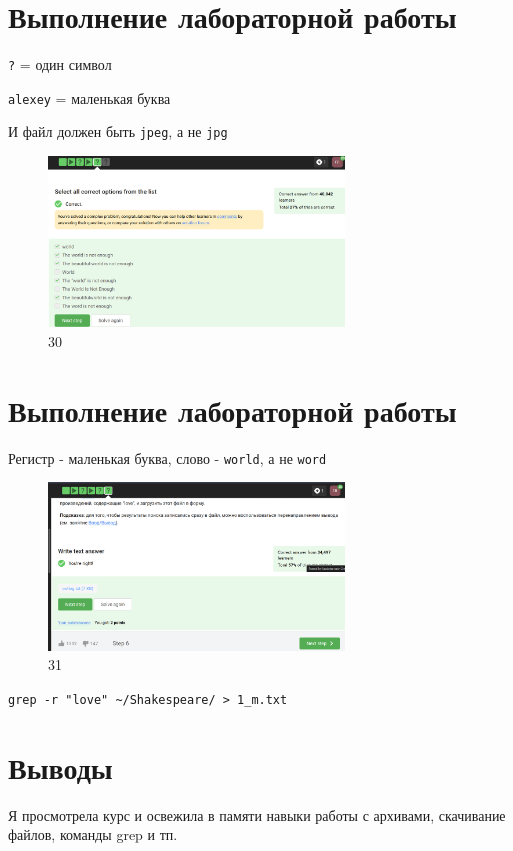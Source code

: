 \hypertarget{ux432ux44bux43fux43eux43bux43dux435ux43dux438ux435-ux43bux430ux431ux43eux440ux430ux442ux43eux440ux43dux43eux439-ux440ux430ux431ux43eux442ux44b-20}{%
\section{Выполнение лабораторной
работы}\label{ux432ux44bux43fux43eux43bux43dux435ux43dux438ux435-ux43bux430ux431ux43eux440ux430ux442ux43eux440ux43dux43eux439-ux440ux430ux431ux43eux442ux44b-20}}

\texttt{?} = один символ

\texttt{alexey} = маленькая буква

И файл должен быть \texttt{jpeg}, а не \texttt{jpg}

\begin{figure}
\hypertarget{fig:030}{%
\centering
\includegraphics[width=0.7\textwidth,height=\textheight]{image/30.png}
\caption{30}\label{fig:030}
}
\end{figure}

\hypertarget{ux432ux44bux43fux43eux43bux43dux435ux43dux438ux435-ux43bux430ux431ux43eux440ux430ux442ux43eux440ux43dux43eux439-ux440ux430ux431ux43eux442ux44b-21}{%
\section{Выполнение лабораторной
работы}\label{ux432ux44bux43fux43eux43bux43dux435ux43dux438ux435-ux43bux430ux431ux43eux440ux430ux442ux43eux440ux43dux43eux439-ux440ux430ux431ux43eux442ux44b-21}}

Регистр - маленькая буква, слово - \texttt{world}, а не \texttt{word}

\begin{figure}
\hypertarget{fig:031}{%
\centering
\includegraphics[width=0.7\textwidth,height=\textheight]{image/31.png}
\caption{31}\label{fig:031}
}
\end{figure}

\texttt{grep\ -r\ "love"\ \textasciitilde{}/Shakespeare/\ \textgreater{}\ 1\_m.txt}

\hypertarget{ux432ux44bux432ux43eux434ux44b}{%
\section{Выводы}\label{ux432ux44bux432ux43eux434ux44b}}

Я просмотрела курс и освежила в памяти навыки работы с архивами,
скачивание файлов, команды grep и тп.
